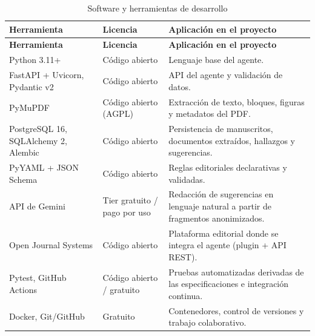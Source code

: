 \begin{longtable}{@{}>{\raggedright\arraybackslash}p{}>{\raggedright\arraybackslash}p{}>{\raggedright\arraybackslash}p{}@{}}
\caption{Software y herramientas de desarrollo}\label{tab:2-2}\\
\toprule
\textbf{Herramienta} & \textbf{Licencia} & \textbf{Aplicación en el proyecto} \\
\midrule
\endfirsthead
\toprule
\textbf{Herramienta} & \textbf{Licencia} & \textbf{Aplicación en el proyecto} \\
\midrule
\endhead
\bottomrule
\endfoot
\endlastfoot
Python 3.11+ & Código abierto & Lenguaje base del agente. \\
FastAPI + Uvicorn, Pydantic v2 & Código abierto & API del agente y validación de datos. \\
PyMuPDF & Código abierto (AGPL) & Extracción de texto, bloques, figuras y metadatos del PDF. \\
PostgreSQL 16, SQLAlchemy 2, Alembic & Código abierto & Persistencia de manuscritos, documentos extraídos, hallazgos y sugerencias. \\
PyYAML + JSON Schema & Código abierto & Reglas editoriales declarativas y validadas. \\
API de Gemini & Tier gratuito / pago por uso & Redacción de sugerencias en lenguaje natural a partir de fragmentos anonimizados. \\
Open Journal Systems & Código abierto & Plataforma editorial donde se integra el agente (plugin + API REST). \\
Pytest, GitHub Actions & Código abierto / gratuito & Pruebas automatizadas derivadas de las especificaciones e integración continua. \\
Docker, Git/GitHub & Gratuito & Contenedores, control de versiones y trabajo colaborativo. \\
\end{longtable}

